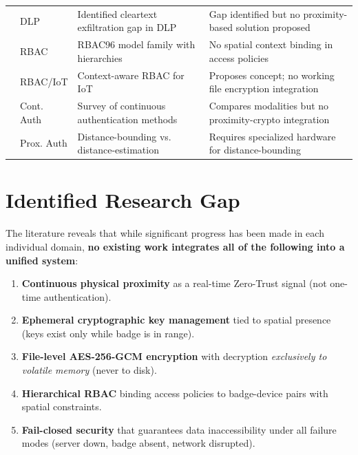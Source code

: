 \documentclass[conference]{IEEEtran}
\begin{document}
\begin{table}[htbp]
\begin{tabularx}{\textwidth}{l l X X}
        \cite{alneyadi2016} & DLP & Identified cleartext exfiltration gap in DLP & Gap identified but no proximity-based solution proposed \\
        \cite{sandhu1996} & RBAC & RBAC96 model family with hierarchies & No spatial context binding in access policies \\
        \cite{gupta2020} & RBAC/IoT & Context-aware RBAC for IoT & Proposes concept; no working file encryption integration \\
        \cite{patel2016} & Cont. Auth & Survey of continuous authentication methods & Compares modalities but no proximity-crypto integration \\
        \cite{rasmussen2009} & Prox. Auth & Distance-bounding vs. distance-estimation & Requires specialized hardware for distance-bounding \\
        \bottomrule
    \end{tabularx}
\end{table}

\section{Identified Research Gap}
\label{sec:gaps}

The literature reveals that while significant progress has been made in each individual domain, \textbf{no existing work integrates all of the following into a unified system}:

\begin{enumerate}[noitemsep]
    \item \textbf{Continuous physical proximity} as a real-time Zero-Trust signal (not one-time authentication).
    \item \textbf{Ephemeral cryptographic key management} tied to spatial presence (keys exist only while badge is in range).
    \item \textbf{File-level AES-256-GCM encryption} with decryption \textit{exclusively to volatile memory} (never to disk).
    \item \textbf{Hierarchical RBAC} binding access policies to badge-device pairs with spatial constraints.
    \item \textbf{Fail-closed security} that guarantees data inaccessibility under all failure modes (server down, badge absent, network disrupted).
\end{enumerate}
\end{document}
